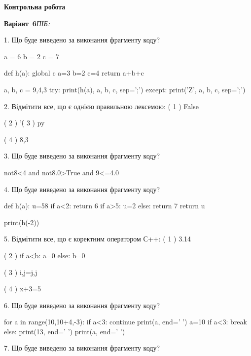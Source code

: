 \documentclass[11pt]{article}
\begin{document}
{\large\textbf{Контрольна робота}}

\textbf{Варіант \No\,6}\hfill \textit{ПІБ:}\,\underline{\hspace{60mm}}
\vspace{4mm}

1. Що буде виведено за виконання фрагменту коду?

a = 6
b = 2
c = 7

def h(a):
global c    a=3
    b=2
    c=4
    return a+b+c

a, b, c = 9,4,3
try:
    print(h(a), a, b, c, sep=';')
except:
    print('Z', a, b, c, sep=';')
\vspace{5mm}

2. %
Відмітити все, що є однією правильною лексемою:
( 1 ) False

( 2 ) '\'

( 3 ) py

( 4 ) 8,3
\vspace{5mm}

3. Що буде виведено за виконання фрагменту коду?

not8<4 and not8.0>True and 9<=4.0
\vspace{5mm}

4. Що буде виведено за виконання фрагменту коду?

def h(a):
    u=58
    if a<2: 
        return 6
    if a>5:
         u=2
    else:
         return 7
    return u

print(h(-2))
\vspace{5mm}

5. %
Відмітити все, що є коректним оператором С++:
( 1 ) 3.14%

( 2 ) if a<b: a=0 else: b=0

( 3 ) i,j=j,j

( 4 ) x+3=5
\vspace{5mm}

6. Що буде виведено за виконання фрагменту коду?

for a in range(10,10+4,-3):
    if a<3:
        continue
    print(a, end=' ')
    a=10
    if a<3:
        break
else:
    print(13, end=' ')
print(a, end=' ')
\vspace{5mm}

7. Що буде виведено за виконання фрагменту коду?
\end{document}
